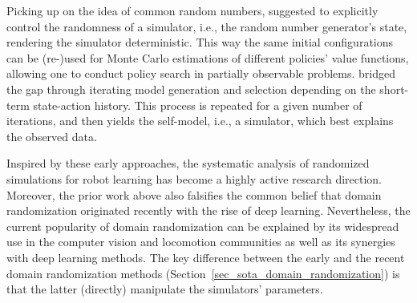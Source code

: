 \documentclass[utf8]{frontiersSCNS} %
\begin{document}
%
Picking up on the idea of common random numbers, \citet{Ng_Jordan_00} suggested to explicitly control the randomness of a simulator, i.e., the random number generator's state, rendering the simulator deterministic.
This way the same initial configurations can be (re-)used for Monte Carlo estimations of different policies' value functions, allowing one to conduct policy search in partially observable problems.
%
\citet{Bongard_etal_2006} bridged the \simtoreal gap through iterating model generation and selection depending on the short-term state-action history.
This process is repeated for a given number of iterations, and then yields the self-model, i.e., a simulator, which best explains the observed data.

Inspired by these early approaches, the systematic analysis of randomized simulations for robot learning has become a highly active research direction.  
Moreover, the prior work above also falsifies the common belief that domain randomization originated recently with the rise of deep learning.
Nevertheless, the current popularity of domain randomization can be explained by its widespread use in the computer vision and locomotion communities as well as its synergies with deep learning methods.
The key difference between the early and the recent domain randomization methods (Section~\ref{sec_sota_domain_randomization}) is that the latter (directly) manipulate the simulators' parameters.

\end{document}
